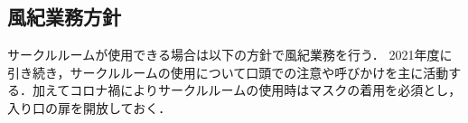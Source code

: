 \subsection*{風紀業務方針}


サークルルームが使用できる場合は以下の方針で風紀業務を行う．
2021年度に引き続き，サークルルームの使用について口頭での注意や呼びかけを主に活動する．加えてコロナ禍によりサークルルームの使用時はマスクの着用を必須とし，入り口の扉を開放しておく．
